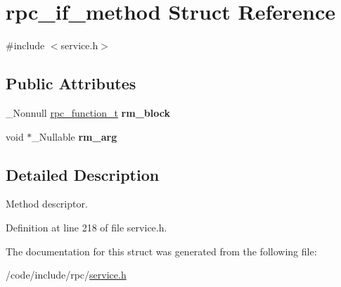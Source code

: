 \hypertarget{structrpc__if__method}{}\section{rpc\+\_\+if\+\_\+method Struct Reference}
\label{structrpc__if__method}


{\ttfamily \#include $<$service.\+h$>$}

\subsection*{Public Attributes}
\begin{DoxyCompactItemize}
\item 
\+\_\+\+Nonnull \hyperlink{service_8h_ae49a22468cfcd4adfa558078e9e4e312}{rpc\+\_\+function\+\_\+t} {\bfseries rm\+\_\+block}\hypertarget{structrpc__if__method_a5db192112740ed1adb36f74ff7c92a80}{}\label{structrpc__if__method_a5db192112740ed1adb36f74ff7c92a80}

\item 
void $\ast$\+\_\+\+Nullable {\bfseries rm\+\_\+arg}\hypertarget{structrpc__if__method_a85a2f339a726ef4afb885cbf157c0998}{}\label{structrpc__if__method_a85a2f339a726ef4afb885cbf157c0998}

\end{DoxyCompactItemize}


\subsection{Detailed Description}
Method descriptor. 

Definition at line 218 of file service.\+h.



The documentation for this struct was generated from the following file\+:\begin{DoxyCompactItemize}
\item 
/code/include/rpc/\hyperlink{service_8h}{service.\+h}\end{DoxyCompactItemize}
